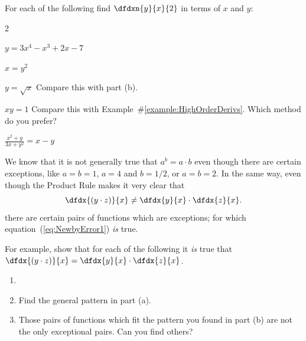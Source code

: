 \begin{ProficiencyDrill}
  For each of the following find $\dfdxn{y}{x}{2}$ in terms of $x$
  and $y$:
  \begin{enumerate}[label={\bf{}(\alph*)}]
    \begin{multicols}{2}
    \item $y=3x^4-x^3+2x-7$
    \item $x=y^2$
    \item $y=\sqrt{x}$ Compare this with part (b).
    \item $xy=1$ Compare this with
      Example~\#\ref{example:HighOrderDerivs}. Which method do you
      prefer?
    \item $\frac{x^2+y}{3x+y^2}=x-y$ 
   \end{multicols}
  \end{enumerate}
\end{ProficiencyDrill}


  We know that it is not generally true that $a^b=a\cdot b$ even
  though there are certain exceptions, like $a=b=1$, $a=4$ and
 $b=1/2$, or $a=b=2$. In the same way, even though the Product Rule
  makes it very clear that
  \begin{equation}
    \dfdx{(y\cdot z)}{x}\neq  \dfdx{y}{x}\cdot\dfdx{z}{x}.\label{eq:NewbyError1}
  \end{equation}
  there are certain pairs of functions which are exceptions; for which
  equation~(\ref{eq:NewbyError1}) \emph{is} true.

\pagebreak[4]
\begin{embeddedproblem}
  \label{problem:NewbyError1}
  For example, show that for each of the following it \emph{is} true
  that $
  \dfdx{(y\cdot z)}{x}=  \dfdx{y}{x}\cdot\dfdx{z}{x}$.
  \begin{enumerate}[label={\bf{}(\alph*)}]
  \item 
    \begin{enumerate}[label={\bf{}(\roman*)}]
    \end{enumerate}
  \item Find the general pattern in part (a).
  \item Those pairs of functions which fit the pattern you found in
    part (b) are not the only exceptional pairs. Can you find others?
  \end{enumerate}
\end{embeddedproblem}


